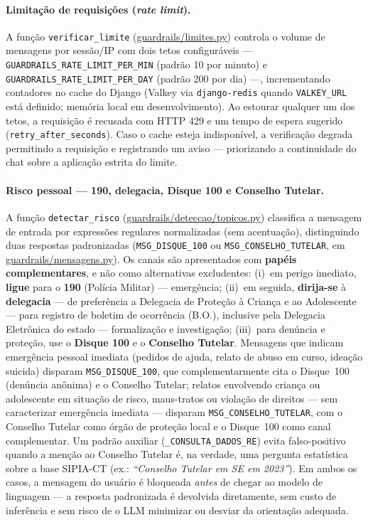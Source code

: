 \documentclass[11pt,a4paper]{article}
\begin{document}
\paragraph{Limitação de requisições (\textit{rate limit}).} A função \texttt{verificar\_limite} (\url{guardrails/limites.py}) controla o volume de mensagens por sessão/IP com dois tetos configuráveis — \texttt{GUARDRAILS\_RATE\_LIMIT\_PER\_MIN} (padrão 10 por minuto) e \texttt{GUARDRAILS\_RATE\_LIMIT\_PER\_DAY} (padrão 200 por dia) —, incrementando contadores no cache do Django (Valkey via \texttt{django-redis} quando \texttt{VALKEY\_URL} está definido; memória local em desenvolvimento). Ao estourar qualquer um dos tetos, a requisição é recusada com HTTP 429 e um tempo de espera sugerido (\texttt{retry\_after\_seconds}). Caso o cache esteja indisponível, a verificação degrada permitindo a requisição e registrando um aviso — priorizando a continuidade do chat sobre a aplicação estrita do limite.

\paragraph{Risco pessoal — 190, delegacia, Disque 100 e Conselho Tutelar.} A função \texttt{detectar\_risco} (\url{guardrails/deteccao/topicos.py}) classifica a mensagem de entrada por expressões regulares normalizadas (sem acentuação), distinguindo duas respostas padronizadas (\texttt{MSG\_DISQUE\_100} ou \texttt{MSG\_CONSELHO\_TUTELAR}, em \url{guardrails/mensagens.py}). Os canais são apresentados com \textbf{papéis complementares}, e não como alternativas excludentes: (i)~em perigo imediato, \textbf{ligue} para o \textbf{190} (Polícia Militar) — emergência; (ii)~em seguida, \textbf{dirija-se} à \textbf{delegacia} — de preferência a Delegacia de Proteção à Criança e ao Adolescente — para registro de boletim de ocorrência (B.O.), inclusive pela Delegacia Eletrônica do estado — formalização e investigação; (iii)~para denúncia e proteção, use o \textbf{Disque 100} e o \textbf{Conselho Tutelar}. Mensagens que indicam emergência pessoal imediata (pedidos de ajuda, relato de abuso em curso, ideação suicida) disparam \texttt{MSG\_DISQUE\_100}, que complementarmente cita o Disque~100 (denúncia anônima) e o Conselho Tutelar; relatos envolvendo criança ou adolescente em situação de risco, maus-tratos ou violação de direitos — sem caracterizar emergência imediata — disparam \texttt{MSG\_CONSELHO\_TUTELAR}, com o Conselho Tutelar como órgão de proteção local e o Disque~100 como canal complementar. Um padrão auxiliar (\texttt{\_CONSULTA\_DADOS\_RE}) evita falso-positivo quando a menção ao Conselho Tutelar é, na verdade, uma pergunta estatística sobre a base SIPIA-CT (ex.: \textit{``Conselho Tutelar em SE em 2023''}). Em ambos os casos, a mensagem do usuário é bloqueada \emph{antes} de chegar ao modelo de linguagem — a resposta padronizada é devolvida diretamente, sem custo de inferência e sem risco de o LLM minimizar ou desviar da orientação adequada.
\end{document}
